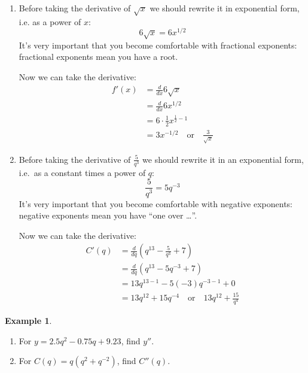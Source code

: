 \documentclass[oneside]{book}
\newcommand{\deriv}[2]{\frac{d#1}{d#2}}
\newcommand{\ddx}{\deriv {}x}
\newcommand{\ddq}{\deriv {}q}
\theoremstyle{definition}
\newtheorem{example}{Example}
\theoremstyle{solution}
\newtheorem*{solution}{Solution}
\newenvironment{solution}{\vspace{2in}\comment}{\endcomment}
\begin{document}
\begin{solution}
\begin{enumerate}
\item Before taking the derivative of $\sqrt{x}$ we should rewrite it
  in exponential form, i.e. as a power of $x$:
$$
6\sqrt{x}=6x^{1/2}
$$ 
It's very important that you become comfortable with fractional
exponents: fractional exponents mean you have a root.  

Now we can take the derivative:
\begin{align*}
f' (x) & = \ddx 6\sqrt{x}\\
       & = \ddx 6x^{1/2}\\
       & = 6\cdot \frac 12 x^{\tfrac 12 -1}\\
       & = 3x^{-1/2}\quad \text{or}\quad \frac{3}{\sqrt{x}}
\end{align*}

\item Before taking the derivative of $\frac{5}{q^3}$ we should 
  rewrite it in an exponential form, i.e.\ as a constant times a
  power of $q$:
$$
\frac{5}{q^3} = 5q^{-3}
$$
It's very important that you become comfortable with negative
exponents: negative exponents mean you have ``one over \dots''.

Now we can take the derivative:
\begin{align*}
C'(q) & = \ddq (q^{13}-\frac{5}{q^3}+7)\\
      & = \ddq (q^{13} -5q^{-3}+7)\\
      & = 13q^{13-1} -5(-3)q^{-3-1}+0\\
      & = 13q^{12} +15 q^{-4}\quad \text{or}\quad 13q^{12}+\frac{15}{q^4}
\end{align*}
\end{enumerate}
\end{solution}

\begin{example}
\begin{enumerate}
\item For $y=2.5q^2-0.75q+9.23$, find $y''$.
\item For $C(q) = q(q^2+q^{-2})$, find $C''(q)$.
\end{enumerate}
\end{example}
\end{document}
